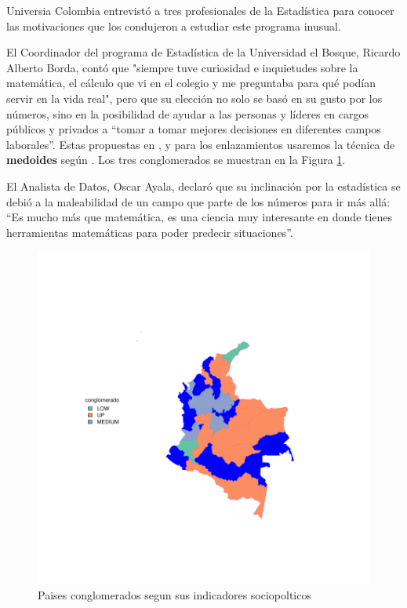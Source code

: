 \documentclass{article}
\begin{document}
Universia Colombia entrevistó a tres profesionales de la Estadística para conocer las motivaciones que los condujeron a estudiar este programa inusual.

El Coordinador del programa de Estadística de la Universidad el Bosque, Ricardo Alberto Borda, contó que "siempre tuve curiosidad e inquietudes sobre la matemática, el cálculo que vi en el colegio y me preguntaba para qué podían servir en la vida real", pero que su elección no solo se basó en su gusto por los números, sino en la posibilidad de ayudar a las personas y líderes en cargos públicos y privados a “tomar a tomar mejores decisiones en diferentes campos laborales”. Estas propuestas en \cite{gower_general_1971}, y para los enlazamientos usaremos la técnica de {\bf medoides} según \cite{macqueen_methods_nodate}. Los tres conglomerados se muestran en la Figura \ref{clustmap}.

\clearpage

El Analista de Datos, Oscar Ayala, declaró que su inclinación por la estadística se debió a la maleabilidad de un campo que parte de los números para ir más allá: “Es mucho más que matemática, es una ciencia muy interesante en donde tienes herramientas matemáticas para poder predecir situaciones”.





\begin{figure}[h]
\centering
\includegraphics{Proyecto_Final-plotMap1}
\caption{Paises conglomerados segun sus indicadores sociopolticos}\label{clustmap}
\end{figure}




\renewcommand{\refname}{Bibliografia}

\end{document}
